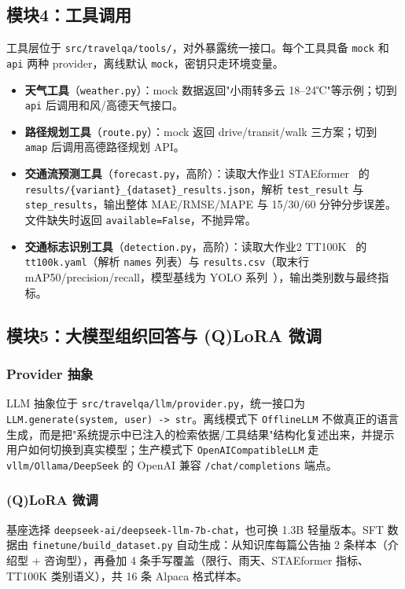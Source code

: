 \documentclass[bwprint]{report}
\begin{document}
\subsection{模块4：工具调用}
工具层位于 \texttt{src/travelqa/tools/}，对外暴露统一接口。每个工具具备 \texttt{mock} 和 \texttt{api} 两种 provider，离线默认 \texttt{mock}，密钥只走环境变量。

\begin{itemize}
    \item \textbf{天气工具}（\texttt{weather.py}）：mock 数据返回"小雨转多云 18--24℃"等示例；切到 \texttt{api} 后调用和风/高德天气接口。
    \item \textbf{路径规划工具}（\texttt{route.py}）：mock 返回 drive/transit/walk 三方案；切到 \texttt{amap} 后调用高德路径规划 API。
    \item \textbf{交通流预测工具}（\texttt{forecast.py}，高阶）：读取大作业1 STAEformer~\cite{staeformer} 的 \texttt{results/\{variant\}\_\{dataset\}\_results.json}，解析 \texttt{test\_result} 与 \texttt{step\_results}，输出整体 MAE/RMSE/MAPE 与 15/30/60 分钟分步误差。文件缺失时返回 \texttt{available=False}，不抛异常。
    \item \textbf{交通标志识别工具}（\texttt{detection.py}，高阶）：读取大作业2 TT100K~\cite{tt100k_dataset} 的 \texttt{tt100k.yaml}（解析 \texttt{names} 列表）与 \texttt{results.csv}（取末行 mAP50/precision/recall，模型基线为 YOLO 系列~\cite{yolo,ultralytics_yolo11}），输出类别数与最终指标。
\end{itemize}

\subsection{模块5：大模型组织回答与 (Q)LoRA 微调}
\subsubsection{Provider 抽象}
LLM 抽象位于 \texttt{src/travelqa/llm/provider.py}，统一接口为 \texttt{LLM.generate(system, user) -> str}。离线模式下 \texttt{OfflineLLM} 不做真正的语言生成，而是把"系统提示中已注入的检索依据/工具结果"结构化复述出来，并提示用户如何切换到真实模型；生产模式下 \texttt{OpenAICompatibleLLM} 走 \texttt{vllm/Ollama/DeepSeek} 的 OpenAI 兼容 \texttt{/chat/completions} 端点。

\subsubsection{(Q)LoRA 微调}
基座选择 \texttt{deepseek-ai/deepseek-llm-7b-chat}，也可换 1.3B 轻量版本。SFT 数据由 \texttt{finetune/build\_dataset.py} 自动生成：从知识库每篇公告抽 2 条样本（介绍型 + 咨询型），再叠加 4 条手写覆盖（限行、雨天、STAEformer 指标、TT100K 类别语义），共 16 条 Alpaca 格式样本。
\end{document}
